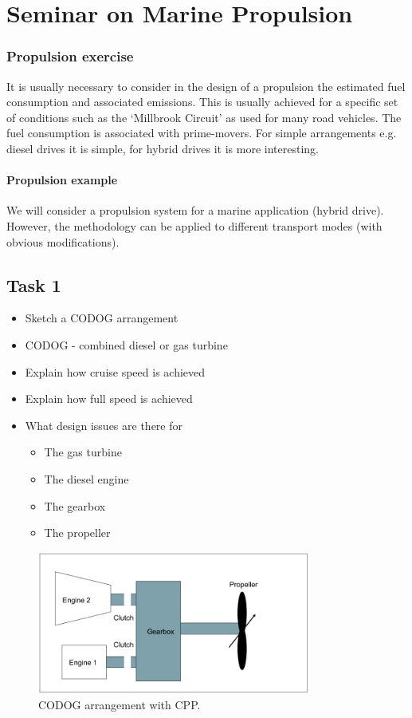 \chapter{Seminar on Marine Propulsion}
\subsection{Propulsion exercise}
It is usually necessary to consider in the design of a propulsion the estimated fuel consumption and associated emissions. This is usually achieved for a specific set of conditions such as the `Millbrook Circuit' as used for many road vehicles. The fuel consumption is associated with prime-movers. For simple arrangements e.g. diesel drives it is simple, for hybrid drives it is more interesting.
\subsubsection{Propulsion example}
We will consider a propulsion system for a marine application (hybrid drive). However, the methodology can be applied to different transport modes (with obvious modifications).
\section{Task 1}
\begin{itemize}
    \item Sketch a CODOG arrangement
    \item CODOG - combined diesel or gas turbine
    \item Explain how cruise speed is achieved
    \item Explain how full speed is achieved
    \item What design issues are there for
          \begin{itemize}
              \item The gas turbine
              \item The diesel engine
              \item The gearbox
              \item The propeller
          \end{itemize}
\end{itemize}
\begin{figure}[H]
    \centering
    \includegraphics[width = 0.8\textwidth]{img/figure70.png}
    \caption{CODOG arrangement with CPP.}
\end{figure}

